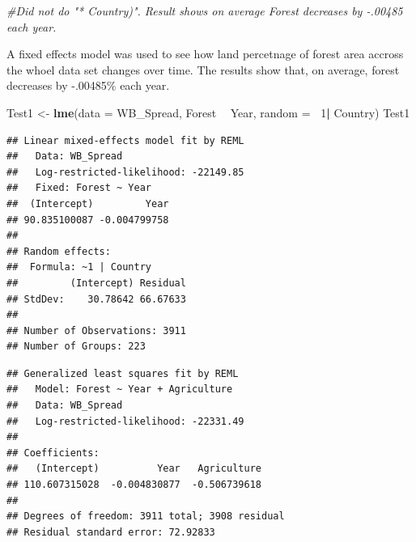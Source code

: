 \documentclass[12pt,]{article}
\newenvironment{Shaded}{\begin{snugshade}}{\end{snugshade}}
\newcommand{\KeywordTok}[1]{\textcolor[rgb]{0.13,0.29,0.53}{\textbf{#1}}}
\newcommand{\DataTypeTok}[1]{\textcolor[rgb]{0.13,0.29,0.53}{#1}}
\newcommand{\DecValTok}[1]{\textcolor[rgb]{0.00,0.00,0.81}{#1}}
\newcommand{\StringTok}[1]{\textcolor[rgb]{0.31,0.60,0.02}{#1}}
\newcommand{\CommentTok}[1]{\textcolor[rgb]{0.56,0.35,0.01}{\textit{#1}}}
\newcommand{\OperatorTok}[1]{\textcolor[rgb]{0.81,0.36,0.00}{\textbf{#1}}}
\newcommand{\NormalTok}[1]{#1}
\begin{document}
\begin{Shaded}
\begin{Highlighting}[]
\CommentTok{#Did not do "* Country)". Result shows on average Forest decreases by -.00485 each year. }
\end{Highlighting}
\end{Shaded}

A fixed effects model was used to see how land percetnage of forest area
accross the whoel data set changes over time. The results show that, on
average, forest decreases by -.00485\% each year.

\begin{Shaded}
\begin{Highlighting}[]
\NormalTok{Test1 <-}\StringTok{  }\KeywordTok{lme}\NormalTok{(}\DataTypeTok{data =}\NormalTok{ WB_Spread,}
\NormalTok{              Forest }\OperatorTok{~}\StringTok{ }\NormalTok{Year,}
              \DataTypeTok{random =} \OperatorTok{~}\DecValTok{1}\OperatorTok{|}\StringTok{ }\NormalTok{Country)}
\NormalTok{Test1}
\end{Highlighting}
\end{Shaded}

\begin{verbatim}
## Linear mixed-effects model fit by REML
##   Data: WB_Spread 
##   Log-restricted-likelihood: -22149.85
##   Fixed: Forest ~ Year 
##  (Intercept)         Year 
## 90.835100087 -0.004799758 
## 
## Random effects:
##  Formula: ~1 | Country
##         (Intercept) Residual
## StdDev:    30.78642 66.67633
## 
## Number of Observations: 3911
## Number of Groups: 223
\end{verbatim}

\begin{Shaded}
\end{Shaded}

\begin{verbatim}
## Generalized least squares fit by REML
##   Model: Forest ~ Year + Agriculture 
##   Data: WB_Spread 
##   Log-restricted-likelihood: -22331.49
## 
## Coefficients:
##   (Intercept)          Year   Agriculture 
## 110.607315028  -0.004830877  -0.506739618 
## 
## Degrees of freedom: 3911 total; 3908 residual
## Residual standard error: 72.92833
\end{verbatim}
\end{document}
